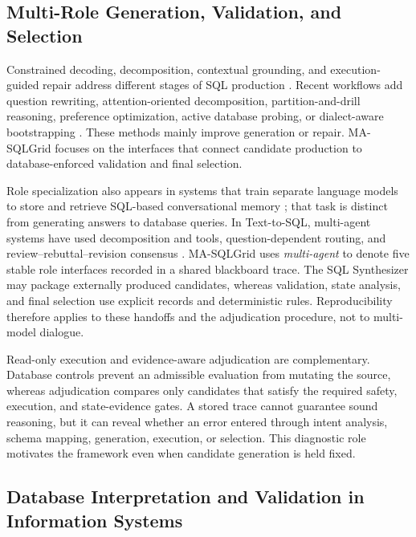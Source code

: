 \documentclass[information,article,submit,moreauthors]{Definitions/mdpi}
\newcommand{\masql}{MA-SQLGrid}
\begin{document}
\subsection{Multi-Role Generation, Validation, and Selection}

Constrained decoding, decomposition, contextual grounding, and execution-guided repair address different stages of SQL production \cite{scholak2021picard,nan2023enhancing,sun2023sqlprompt,pourreza2023dinsql,talaei2024chess}. Recent workflows add question rewriting, attention-oriented decomposition, partition-and-drill reasoning, preference optimization, active database probing, or dialect-aware bootstrapping \cite{mao2024dartsql,xie2024deasql,luo2024ptdsql,zhai2025executionfeedback,xie2026sdesql,zhang2025exesql}. These methods mainly improve generation or repair. \masql{} focuses on the interfaces that connect candidate production to database-enforced validation and final selection.

Role specialization also appears in systems that train separate language models to store and retrieve SQL-based conversational memory \cite{lee2025team}; that task is distinct from generating answers to database queries. In Text-to-SQL, multi-agent systems have used decomposition and tools, question-dependent routing, and review--rebuttal--revision consensus \cite{wang2025macsql,shao2025qcmasql,xia2025r3}. \masql{} uses \emph{multi-agent} to denote five stable role interfaces recorded in a shared blackboard trace. The SQL Synthesizer may package externally produced candidates, whereas validation, state analysis, and final selection use explicit records and deterministic rules. Reproducibility therefore applies to these handoffs and the adjudication procedure, not to multi-model dialogue.

Read-only execution and evidence-aware adjudication are complementary. Database controls prevent an admissible evaluation from mutating the source, whereas adjudication compares only candidates that satisfy the required safety, execution, and state-evidence gates. A stored trace cannot guarantee sound reasoning, but it can reveal whether an error entered through intent analysis, schema mapping, generation, execution, or selection. This diagnostic role motivates the framework even when candidate generation is held fixed.

\subsection{Database Interpretation and Validation in Information Systems}
\end{document}
